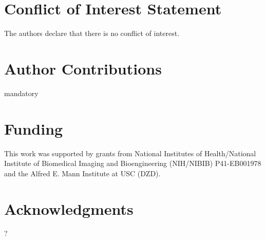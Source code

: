 \documentclass[utf8]{frontiersSCNS} %
\begin{document}

\section*{Conflict of Interest Statement}
The authors declare that there is no conflict of interest.

\section*{Author Contributions}
mandatory

\section*{Funding}
This work was supported by grants from National Institutes of Health/National Institute of Biomedical Imaging and Bioengineering (NIH/NIBIB) P41-EB001978 and the Alfred E. Mann Institute at USC (DZD).

\section*{Acknowledgments}
?
\end{document}
